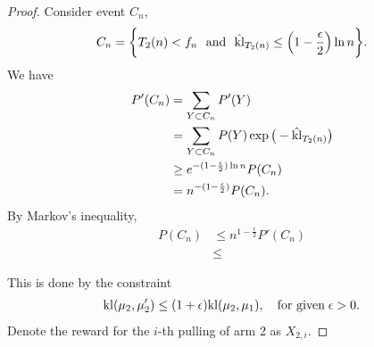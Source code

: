 \begin{proof}
    Consider event $C_n$,
    \begin{align}
        C_n=\bigg\{ T_2(n)<f_n
            ~~\text{and}~~
            \hat {{\mathop{\mathrm{kl}}}}_{T_2(n)} \le \Big(1-\frac{\epsilon}{2}\Big)\ln n \bigg\}.
    \end{align}
    We have
    \begin{align}
        P'(C_n)
            &= \sum_{Y\subset C_n} P'(Y) \\
            &= \sum_{Y\subset C_n} P(Y) \exp\big(-\hat{{\mathop{\mathrm{kl}}}}_{T_2(n)}\big) \\
            &\ge e^{-(1-\frac{\epsilon}{2})\ln n} P(C_n) \\
            &= n^{-(1-\frac{\epsilon}{2})} P(C_n).
    \end{align}
    By Markov's inequality,
    \begin{align}
        P(C_n)
            &\le n^{1-\frac{\epsilon}{2}} P'(C_n) \\
            &\le
    \end{align}

    This is done by the constraint
    \begin{align}
        {\mathop{\mathrm{kl}}}(\mu_2, \mu_2')\le(1+\epsilon){\mathop{\mathrm{kl}}}(\mu_2,\mu_1), \quad \text{for given}\; \epsilon>0.
    \end{align}
    Denote the reward for the $i$-th pulling of arm 2 as $X_{2,i}$.






\end{proof}
